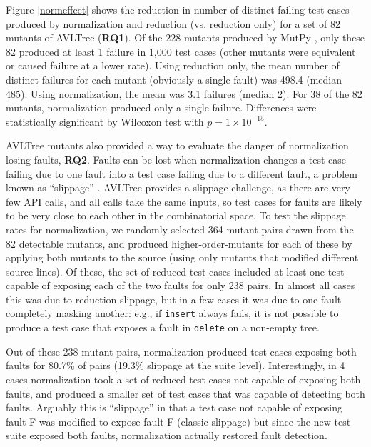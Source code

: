 Figure \ref{normeffect} shows the reduction in number of distinct
failing test cases produced by normalization and reduction
(vs. reduction only) for a set of 82 mutants \cite{mutant} of AVLTree
\cite{Hunter:2007} ({\bf RQ1}).  Of the 228 mutants produced by MutPy
\cite{mutpy}, only these 82 produced at least 1 failure in 1,000 test
cases (other mutants were equivalent or caused failure at a lower
rate).  Using reduction only, the mean number of distinct failures for
each mutant (obviously a single fault) was 498.4 (median 485).  Using normalization, the mean
was 3.1 failures (median 2).  For 38 of the 82 mutants,
normalization produced only a single failure.
Differences were statistically significant by Wilcoxon test with
$p=1\times10^{-15}$.


AVLTree mutants also provided a way to evaluate the danger of
normalization losing faults, {\bf RQ2}.  Faults can be lost when normalization
changes a test case failing due to one fault into a test case failing
due to a different fault, a problem known as ``slippage''
\cite{PLDI13}.  AVLTree provides a slippage challenge, as there are
very few API calls, and all calls take the same inputs, so test cases
for faults are likely to be very close to each other in the
combinatorial space.  To test the slippage rates for normalization, we
randomly selected 364 mutant pairs drawn from the 82 detectable
mutants, and produced higher-order-mutants for each of these by
applying both mutants to the source (using only mutants that modified
different source lines).  Of these, the set of reduced test cases
included at least one test capable of exposing each of the two faults
for only 238 pairs.  In almost all cases this was due to reduction
slippage, but in a few cases it was due to one fault completely
masking another: e.g., if {\tt insert} always fails, it is not
possible to produce a test case that exposes a fault in {\tt delete}
on a non-empty tree.

Out of these 238 mutant pairs, normalization produced test cases
exposing both faults for 80.7\% of pairs (19.3\% slippage at the
suite level).  Interestingly, in 4 cases
normalization took a set of reduced test cases not capable of exposing
both faults, and produced a smaller set of test cases that was capable
of detecting both faults.  Arguably this is ``slippage'' in that a test case not
capable of exposing fault F was modified to expose fault F (classic
slippage) but since the new test suite exposed both faults,
normalization actually restored fault detection.

